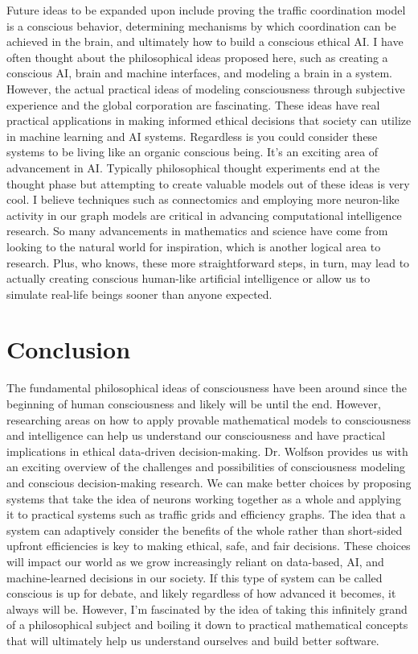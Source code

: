 \documentclass[journal,onecolumn]{IEEEtran}
\begin{document}
Future ideas to be expanded upon include proving the traffic coordination model is a conscious behavior, determining mechanisms by which coordination can be achieved in the brain, and ultimately how to build a conscious ethical AI. I have often thought about the philosophical ideas proposed here, such as creating a conscious AI, brain and machine interfaces, and modeling a brain in a system. However, the actual practical ideas of modeling consciousness through subjective experience and the global corporation are fascinating. These ideas have real practical applications in making informed ethical decisions that society can utilize in machine learning and AI systems. Regardless is you could consider these systems to be living like an organic conscious being. It's an exciting area of advancement in AI. Typically philosophical thought experiments end at the thought phase but attempting to create valuable models out of these ideas is very cool. I believe techniques such as connectomics and employing more neuron-like activity in our graph models are critical in advancing computational intelligence research. So many advancements in mathematics and science have come from looking to the natural world for inspiration, which is another logical area to research. Plus, who knows, these more straightforward steps, in turn, may lead to actually creating conscious human-like artificial intelligence or allow us to simulate real-life beings sooner than anyone expected. 

\section{Conclusion}

The fundamental philosophical ideas of consciousness have been around since the beginning of human consciousness and likely will be until the end. However, researching areas on how to apply provable mathematical models to consciousness and intelligence can help us understand our consciousness and have practical implications in ethical data-driven decision-making. Dr. Wolfson provides us with an exciting overview of the challenges and possibilities of consciousness modeling and conscious decision-making research. We can make better choices by proposing systems that take the idea of neurons working together as a whole and applying it to practical systems such as traffic grids and efficiency graphs. The idea that a system can adaptively consider the benefits of the whole rather than short-sided upfront efficiencies is key to making ethical, safe, and fair decisions. These choices will impact our world as we grow increasingly reliant on data-based, AI, and machine-learned decisions in our society. If this type of system can be called conscious is up for debate, and likely regardless of how advanced it becomes, it always will be. However, I'm fascinated by the idea of taking this infinitely grand of a philosophical subject and boiling it down to practical mathematical concepts that will ultimately help us understand ourselves and build better software. 
\end{document}
